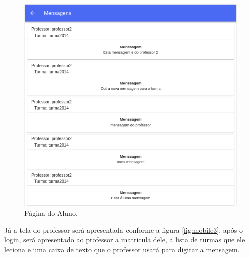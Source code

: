 \begin{figure}[H]
\centering
\includegraphics[scale=0.6]{figuras/mobile3}
\caption{Página do Aluno.}
\label{fig:mobile2}
\end{figure}

Já a tela do professor será apresentada conforme a figura \ref{fig:mobile3}, após o login, será apresentado ao professor a matricula dele, a lista de turmas que ele leciona e uma caixa de texto que o professor usará para digitar a mensagem.

